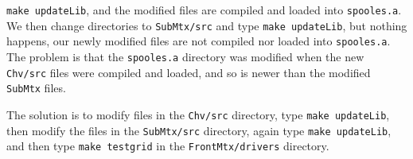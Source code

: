 \begin{itemize}
\begin{itemize}
{\tt make updateLib}, and the modified files are compiled and
loaded into {\tt spooles.a}.
We then change directories to {\tt SubMtx/src} and type
{\tt make updateLib}, but nothing happens, our newly modified files
are not compiled nor loaded into {\tt spooles.a}.
The problem is that the {\tt spooles.a} directory was modified when
the new {\tt Chv/src} files were compiled and loaded, and so is
newer than the modified {\tt SubMtx} files.
\par
The solution is to modify files in the {\tt Chv/src} directory, 
type {\tt make updateLib}, 
then modify the files in the {\tt SubMtx/src} directory, 
again type {\tt make updateLib}, 
and then type {\tt make testgrid} in the {\tt FrontMtx/drivers}
directory.
\end{itemize}
\end{itemize}

